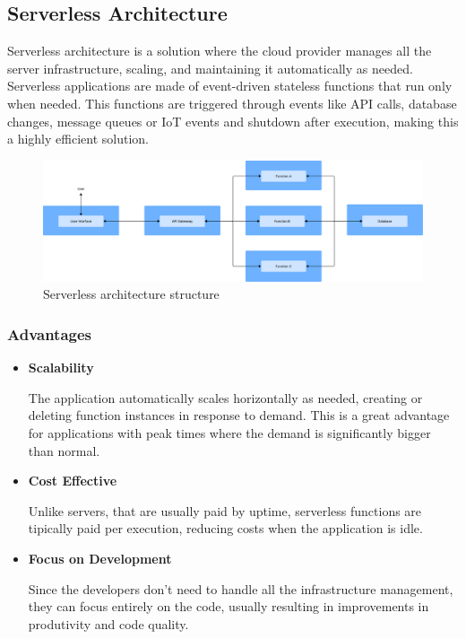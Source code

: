 \subsection{Serverless Architecture}
Serverless architecture is a solution where the cloud provider manages all the
server infrastructure, scaling, and maintaining it automatically as needed.
Serverless applications are made of event-driven stateless functions that run
only when needed\cite{marcelino2024goldfish}. This functions are triggered
through events like \gls{API} calls, database changes, message queues or
\gls{IoT} events and shutdown after execution, making this a highly efficient
solution\cite{s21030928}.

\begin{figure}[htbp]
	\centering
	\includegraphics[width=\textwidth, height=0.5\textheight, keepaspectratio]{Chapters/Figures/Architectures/Serverless.pdf}
	\caption{Serverless architecture structure}
	\label{fig:architectures:serverless}
\end{figure}

\subsubsection{Advantages}
\begin{itemize}

	\item \textbf{Scalability}

	      The application automatically scales horizontally as needed, creating or
	      deleting function instances in response to demand. This is a great
	      advantage for applications with peak times where the demand is
	      significantly bigger than normal\cite{GoogleServerless}.

	\item \textbf{Cost Effective}

	      Unlike servers, that are usually paid by uptime, serverless functions are
	      tipically paid per execution, reducing costs when the application is idle\cite{s23104868}.

	\item \textbf{Focus on Development}

	      Since the developers don't need to handle all the infrastructure management,
	      they can focus entirely on the code, usually resulting in improvements in
	      produtivity and code quality\cite{GoogleServerless}.


\end{itemize}

